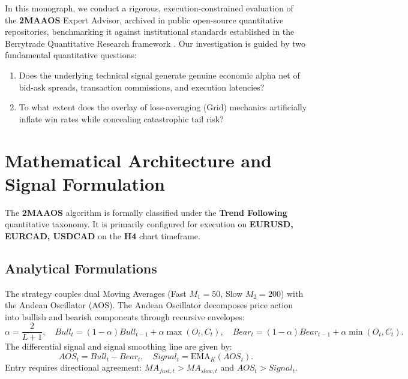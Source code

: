 \documentclass[11pt,a4paper]{article}
\begin{document}
In this monograph, we conduct a rigorous, execution-constrained evaluation of the \textbf{2MAAOS} Expert Advisor, archived in public open-source quantitative repositories, benchmarking it against institutional standards established in the Berrytrade Quantitative Research framework \cite{artsu2026illusion}. Our investigation is guided by two fundamental quantitative questions:
\begin{enumerate}
    \item Does the underlying technical signal generate genuine economic alpha net of bid-ask spreads, transaction commissions, and execution latencies?
    \item To what extent does the overlay of loss-averaging (Grid) mechanics artificially inflate win rates while concealing catastrophic tail risk?
\end{enumerate}

\section{Mathematical Architecture and Signal Formulation}
The \textbf{2MAAOS} algorithm is formally classified under the \textbf{Trend Following} quantitative taxonomy. It is primarily configured for execution on \textbf{EURUSD, EURCAD, USDCAD} on the \textbf{H4} chart timeframe.

\subsection{Analytical Formulations}

The strategy couples dual Moving Averages (Fast $M_1=50$, Slow $M_2=200$) with the Andean Oscillator (AOS).
The Andean Oscillator decomposes price action into bullish and bearish components through recursive envelopes:
\begin{equation}
\alpha = \frac{2}{L + 1}, \quad Bull_t = (1 - \alpha) Bull_{t-1} + \alpha \max(O_t, C_t), \quad Bear_t = (1 - \alpha) Bear_{t-1} + \alpha \min(O_t, C_t).
\end{equation}
The differential signal and signal smoothing line are given by:
\begin{equation}
AOS_t = Bull_t - Bear_t, \quad Signal_t = \text{EMA}_K(AOS_t).
\end{equation}
Entry requires directional agreement: $MA_{fast, t} > MA_{slow, t}$ and $AOS_t > Signal_t$.
\end{document}
